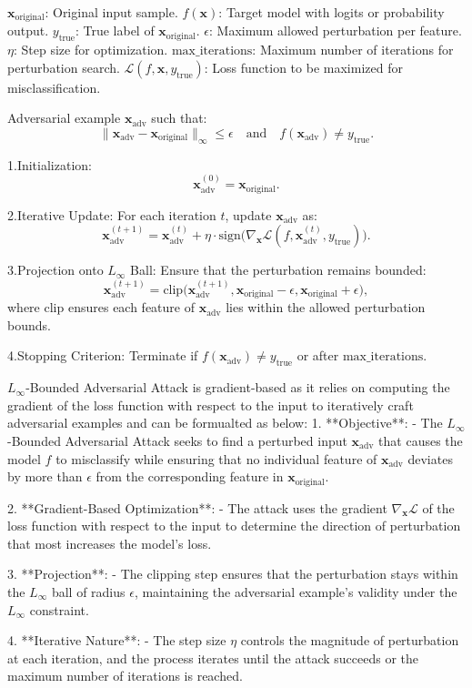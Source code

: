$\mathbf{x}_{\text{original}}$: Original input sample.
$f(\mathbf{x})$: Target model with logits or probability output.
$y_{\text{true}}$: True label of $\mathbf{x}_{\text{original}}$.
$\epsilon$: Maximum allowed perturbation per feature.
$\eta$: Step size for optimization.
$\text{max\_iterations}$: Maximum number of iterations for perturbation search.
$\mathcal{L}(f, \mathbf{x}, y_{\text{true}})$: Loss function to be maximized for misclassification.

Adversarial example $\mathbf{x}_{\text{adv}}$ such that:
  \[
  \|\mathbf{x}_{\text{adv}} - \mathbf{x}_{\text{original}}\|_\infty \leq \epsilon \quad \text{and} \quad f(\mathbf{x}_{\text{adv}}) \neq y_{\text{true}}.
  \]

1.Initialization:
   \[
   \mathbf{x}_{\text{adv}}^{(0)} = \mathbf{x}_{\text{original}}.
   \]

2.Iterative Update:
   For each iteration $t$, update $\mathbf{x}_{\text{adv}}$ as:
   \[
   \mathbf{x}_{\text{adv}}^{(t+1)} = \mathbf{x}_{\text{adv}}^{(t)} + \eta \cdot \text{sign} \big( \nabla_{\mathbf{x}} \mathcal{L}(f, \mathbf{x}_{\text{adv}}^{(t)}, y_{\text{true}}) \big).
   \]

3.Projection onto $L_\infty$ Ball:
   Ensure that the perturbation remains bounded:
   \[
   \mathbf{x}_{\text{adv}}^{(t+1)} = \text{clip}\big(\mathbf{x}_{\text{adv}}^{(t+1)}, \mathbf{x}_{\text{original}} - \epsilon, \mathbf{x}_{\text{original}} + \epsilon \big),
   \]
   where $\text{clip}$ ensures each feature of $\mathbf{x}_{\text{adv}}$ lies within the allowed perturbation bounds.

4.Stopping Criterion:
   Terminate if $f(\mathbf{x}_{\text{adv}}) \neq y_{\text{true}}$ or after $\text{max\_iterations}$.

$L_\infty$-Bounded Adversarial Attack is gradient-based as it relies on computing the gradient of the loss function with respect to the input to iteratively craft adversarial examples and can be formualted as below:
1. **Objective**:
   - The $L_\infty$-Bounded Adversarial Attack seeks to find a perturbed input $\mathbf{x}_{\text{adv}}$ that causes the model $f$ to misclassify while ensuring that no individual feature of $\mathbf{x}_{\text{adv}}$ deviates by more than $\epsilon$ from the corresponding feature in $\mathbf{x}_{\text{original}}$.

2. **Gradient-Based Optimization**:
   - The attack uses the gradient $\nabla_{\mathbf{x}} \mathcal{L}$ of the loss function with respect to the input to determine the direction of perturbation that most increases the model's loss.

3. **Projection**:
   - The clipping step ensures that the perturbation stays within the $L_\infty$ ball of radius $\epsilon$, maintaining the adversarial example's validity under the $L_\infty$ constraint.

4. **Iterative Nature**:
   - The step size $\eta$ controls the magnitude of perturbation at each iteration, and the process iterates until the attack succeeds or the maximum number of iterations is reached.
